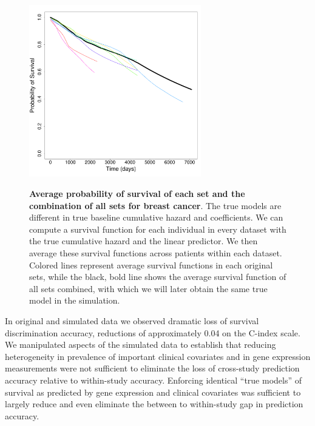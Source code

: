 \documentclass{bioinfo}
\begin{document}
\begin{figure}
  \centering
  \includegraphics[width=7.5cm]{survival_plot.pdf}\\
  \caption{\textbf{Average probability of survival of each set and the
      combination of all sets for breast cancer}. The true models are different in true
    baseline cumulative hazard and coefficients. We can compute %
    a survival function for each individual in every dataset with the
    true cumulative hazard and the linear predictor. 
    We then average these survival functions across patients within each dataset.
    Colored lines represent average survival functions in each original
    sets, while the black, bold line shows the average survival function of
    all sets combined, with which we will later obtain the same true
    model in the simulation.}\label{survplot}
\end{figure}


In original and simulated data we observed
dramatic loss of survival discrimination accuracy, reductions of
approximately 0.04 on the C-index scale. We manipulated aspects of
the simulated data to establish that reducing heterogeneity in
prevalence of important clinical covariates and in gene expression
measurements were not sufficient to eliminate the loss of cross-study
prediction accuracy relative to within-study accuracy.  %
Enforcing identical ``true models'' of survival as predicted by gene expression and clinical covariates
was sufficient to largely reduce and even eliminate the between to within-study gap in
prediction accuracy. %
\end{document}
